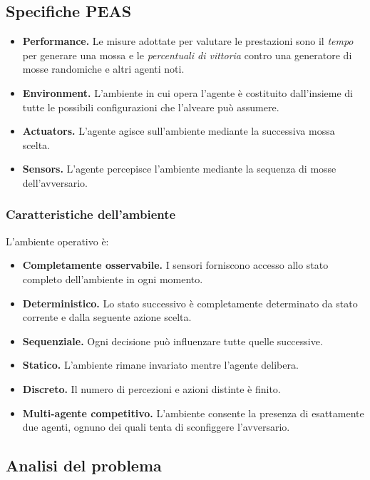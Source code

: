 \documentclass[a4paper,12pt]{article}
\begin{document}
    \subsection{Specifiche PEAS}

    \begin{itemize}
        \item \textbf{Performance.} Le misure adottate per valutare le prestazioni sono il \textit{tempo} per generare una mossa e le \textit{percentuali di vittoria} contro una generatore di mosse randomiche e altri agenti noti.
        \item \textbf{Environment.} L'ambiente in cui opera l'agente è costituito dall'insieme di tutte le possibili configurazioni che l'alveare può assumere.
        \item \textbf{Actuators.} L'agente agisce sull'ambiente mediante la successiva mossa scelta.
        \item \textbf{Sensors.} L'agente percepisce l'ambiente mediante la sequenza di mosse dell'avversario.
    \end{itemize}

    \subsubsection{Caratteristiche dell'ambiente}
    L'ambiente operativo è:
    \begin{itemize}
        \item \textbf{Completamente osservabile.} I sensori forniscono accesso allo stato completo dell'ambiente in ogni momento.
        \item \textbf{Deterministico.} Lo stato successivo è completamente determinato da stato corrente e dalla seguente azione scelta.
        \item \textbf{Sequenziale.} Ogni decisione può influenzare tutte quelle successive.
        \item \textbf{Statico.} L'ambiente rimane invariato mentre l'agente delibera.
        \item \textbf{Discreto.} Il numero di percezioni e azioni distinte è finito.
        \item \textbf{Multi-agente competitivo.} L'ambiente consente la presenza di esattamente due agenti, ognuno dei quali tenta di sconfiggere l'avversario.
    \end{itemize}

    \newpage

    \subsection{Analisi del problema}
\end{document}
